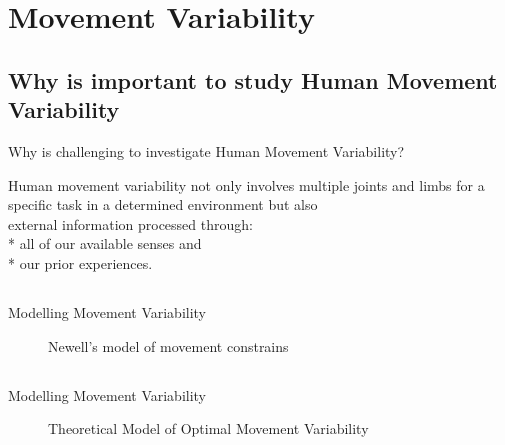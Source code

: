 \section{Movement Variability}


\subsection{Why is important to study Human Movement Variability}
{

\begin{frame}{Why is challenging to investigate Human Movement Variability?}

\Large
Human movement variability not only involves multiple joints and 
limbs for a specific task in a determined environment but also \\ 
external information processed through: \\
* all of our available senses and \\ 
* our prior experiences.

\end{frame}
}


\subsection{}
{
\begin{frame}{Modelling Movement Variability}
    \begin{figure}
	\caption{Newell's model of movement constrains} 
   \end{figure}
\end{frame}
}




\subsection{}
{
\begin{frame}{Modelling Movement Variability}
    \begin{figure}
	\caption{Theoretical Model of Optimal Movement Variability} 
   \end{figure}
\end{frame}
}





